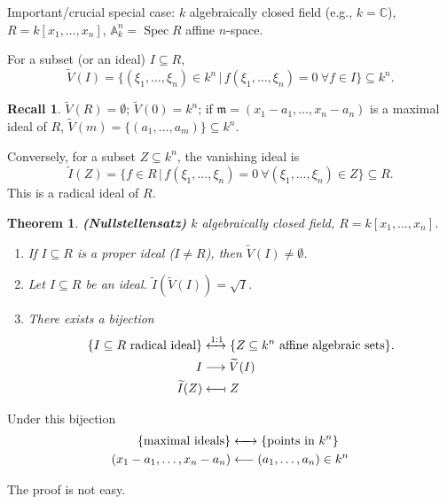 \documentclass[12pt]{article}
\DeclareMathOperator{\Spec}{Spec}
\newtheorem*{theorem}{Theorem}
\theoremstyle{definition}
\newtheorem*{recall}{Recall}
\begin{document}
Important/crucial special case: $k$ algebraically closed field (e.g., $k=\mathbb{C}$), $R=k[x_1,\ldots,x_n]$, $\mathbb{A}_k^n=\Spec R$ affine $n$-space.

For a subset (or an ideal) $I\subseteq R$,
\[\widetilde{V}(I)=\big\{(\xi_1,\ldots,\xi_n)\in k^n\,\big|\,f(\xi_1,\ldots,\xi_n)=0\ \forall f\in I\big\}\subseteq k^n.\]

\begin{recall}
$\widetilde{V}(R)=\emptyset$; $\widetilde{V}(0)=k^n$; if $\mathfrak{m}=(x_1-a_1,\ldots,x_n-a_n)$ is a maximal ideal of $R$, $\widetilde{V}(m)=\{(a_1,\ldots,a_m)\}\subseteq k^n$.
\end{recall}

Conversely, for a subset $Z\subseteq k^n$, the vanishing ideal is
\[\widetilde{I}(Z)=\big\{f\in R\,\big|\,f(\xi_1,\ldots,\xi_n)=0\ \forall(\xi_1,\ldots,\xi_n)\in Z\big\}\subseteq R.\]
This is a radical ideal of $R$.

\begin{theorem}
\emph{\textbf{(Nullstellensatz)}} $k$ algebraically closed field, $R=k[x_1,\ldots,x_n]$.

\begin{enumerate}[label=\arabic*)]
\item If $I\subseteq R$ is a proper ideal ($I\neq R$), then $\widetilde{V}(I)\neq\emptyset$.

\item Let $I\subseteq R$ be an ideal. $\widetilde{I}(\widetilde{V}(I))=\sqrt{I}$.

\item There exists a bijection
\begin{align*}
\{I\subseteq R\text{ radical ideal}\}&\xleftrightarrow{1:1}\{Z\subseteq k^n\text{ affine algebraic sets}\}.\\
I&\longrightarrow\widetilde{V}(I)\\
\widetilde{I}(Z)&\longleftarrow\!\shortmid Z
\end{align*}
\end{enumerate}
\end{theorem}

Under this bijection
\begin{align*}
\{\text{maximal ideals}\}&\xleftrightarrow{\hspace{4.4mm}}\{\text{points in }k^n\}\\
(x_1-a_1,\ldots,x_n-a_n)&\longleftarrow(a_1,\ldots,a_n)\in k^n
\end{align*}

The proof is not easy.
\end{document}
